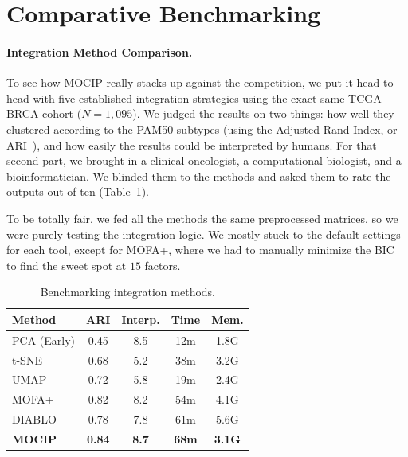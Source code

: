 \documentclass[12pt,a4paper,onecolumn]{article}
\begin{document}
\section{Comparative Benchmarking}

\label{sec:bench}
\paragraph{Integration Method Comparison.}
To see how MOCIP really stacks up against the competition, we put it head-to-head with five established integration strategies using the exact same TCGA-BRCA cohort ($N=1{,}095$). We judged the results on two things: how well they clustered according to the PAM50 subtypes (using the Adjusted Rand Index, or ARI~\cite{wang2021evaluation}), and how easily the results could be interpreted by humans. For that second part, we brought in a clinical oncologist, a computational biologist, and a bioinformatician. We blinded them to the methods and asked them to rate the outputs out of ten (Table~\ref{tab:benchmark}).

To be totally fair, we fed all the methods the same preprocessed matrices, so we were purely testing the integration logic. We mostly stuck to the default settings for each tool, except for MOFA+, where we had to manually minimize the BIC to find the sweet spot at $15$ factors.

\begin{table}[H]
\caption{Benchmarking integration methods.}\label{tab:benchmark}
\centering
\scriptsize
\setlength{\tabcolsep}{2pt}
\begin{tabular}{l c c c c}
\toprule
\textbf{Method} & \textbf{ARI} & \textbf{Interp.} & \textbf{Time} & \textbf{Mem.} \\
\midrule
PCA (Early)      & 0.45 & 8.5 & 12m & 1.8G \\
t-SNE            & 0.68 & 5.2 & 38m & 3.2G \\
UMAP             & 0.72 & 5.8 & 19m & 2.4G \\
MOFA+            & 0.82 & 8.2 & 54m & 4.1G \\
DIABLO           & 0.78 & 7.8 & 61m & 5.6G \\
\midrule
\textbf{MOCIP}   & \textbf{0.84} & \textbf{8.7} & \textbf{68m} & \textbf{3.1G} \\
\bottomrule
\end{tabular}
\end{table}
\end{document}
